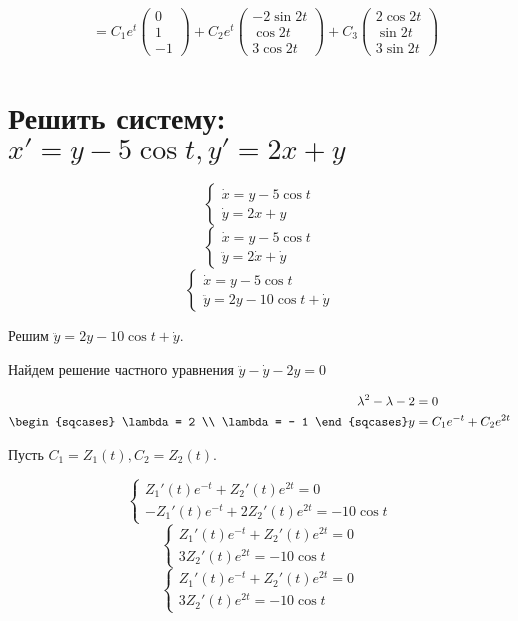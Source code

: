 \begin{align*}
                               & = C_1 e^t \begin{pmatrix} 0 \\ 1 \\ - 1 \end{pmatrix} + C_2e^t \begin{pmatrix} - 2\sin 2t \\ \cos 2t \\ 3\cos 2t \end{pmatrix} + C_3 \begin{pmatrix} 2\cos 2t \\ \sin 2t \\ 3 \sin 2t \end{pmatrix}
\end{align*}

\section{Решить систему: \(x'=y-5\cos t, y'=2x+y\)}

\[\begin{cases}
        \dot x = y - 5\cos t \\
        \dot y = 2x + y
    \end{cases}\]
\[\begin{cases}
        \dot x = y - 5\cos t \\
        \ddot y = 2\dot x + \dot y
    \end{cases}\]
\[\begin{cases}
        \dot x = y - 5\cos t \\
        \ddot y = 2y - 10\cos t + \dot y
    \end{cases}\]

Решим \(\ddot y = 2y - 10\cos t + \dot y\).

Найдем решение частного уравнения \(\ddot y - \dot y - 2y = 0\)

\begin{align*}
    \lambda^2 - \lambda - 2 & = 0                         \\
    \begin{sqcases}
        \lambda = 2 \\
        \lambda = - 1
    \end{sqcases}
    y                       & = C_1 e^{ - t} + C_2 e^{2t} \\
\end{align*}

Пусть \(C_1 = Z_1(t), C_2 = Z_2(t)\).

\[\begin{cases}
        Z_1'(t)e^{ - t} + Z_2'(t) e^{2t} = 0 \\
        -Z_1'(t)e^{ - t} + 2Z_2'(t) e^{2t} = - 10\cos t
    \end{cases}\]
\[\begin{cases}
        Z_1'(t)e^{ - t} + Z_2'(t) e^{2t} = 0 \\
        3Z_2'(t) e^{2t} = - 10\cos t
    \end{cases}\]
\[\begin{cases}
        Z_1'(t)e^{ - t} + Z_2'(t) e^{2t} = 0 \\
        3Z_2'(t) e^{2t} = - 10\cos t
    \end{cases}\]

